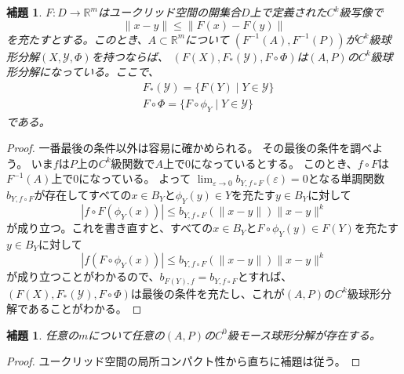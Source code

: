 \documentclass[leqno]{jsarticle}
\newtheorem{lem}[thm]{補題}
\newcommand{\rr}{\mathbb{R}}
\newcommand{\ep}{\varepsilon}
\begin{document}
\begin{lem}\label{push}
$F:D \to \rr^m$はユークリッド空間の開集合$D$上で定義された$C^k$級写像で
\[
\|x-y\|\le \|F(x)-F(y)\|
\]
を充たすとする。このとき、$A\subset \rr^m$について
$(F^{-1}(A), F^{-1}(P))$が$C^k$級球形分解$(X,\mathcal{Y}, \Phi)$を持つならば、
$(F(X), F_*(\mathcal{Y}),F\circ \Phi)$は$(A,P)$の$C^k$級球形分解になっている。ここで、
\begin{align*}
& F_*(\mathcal{Y})=\{F(Y)\mid Y\in \mathcal{Y}\}\\
& F\circ \Phi=\{F\circ \phi_Y\mid Y\in \mathcal{Y}\}
\end{align*}
である。
\end{lem}
\begin{proof}
一番最後の条件以外は容易に確かめられる。
その最後の条件を調べよう。
いま$f$は$P$上の$C^k$級関数で$A$上で$0$になっているとする。
このとき、$f\circ F$は$F^{-1}(A)$上で$0$になっている。
よって
$\lim_{\ep\to 0}b_{Y,f\circ F}(\ep)=0$となる単調関数$b_{Y, f\circ F}$が存在してすべての$x\in B_Y$と$\phi_Y(y)\in Y$を充たす$y\in B_Y$に対して
\[
|f\circ F(\phi_Y(x))|\le b_{Y, f\circ F}(\|x-y\|)\|x-y\|^k
\]
が成り立つ。これを書き直すと、すべての$x\in B_Y$と$F\circ \phi_Y(y)\in F(Y)$を充たす$y\in B_Y$に対して
\[
|f(F\circ \phi_Y(x))|\le b_{Y,f\circ F}(\|x-y\|)\|x-y\|^k
\]
が成り立つことがわかるので、$b_{F(Y),f}=b_{Y,f\circ F}$とすれば、$(F(X), F_*(\mathcal{Y}),F\circ \Phi)$は最後の条件を充たし、これが$(A,P)$の$C^k$級球形分解であることがわかる。
\end{proof}

\begin{lem}\label{k0}
任意の$m$について任意の$(A,P)$の$C^0$級モース球形分解が存在する。
\end{lem}
\begin{proof}
ユークリッド空間の局所コンパクト性から直ちに補題は従う。
\end{proof}
\end{document}
